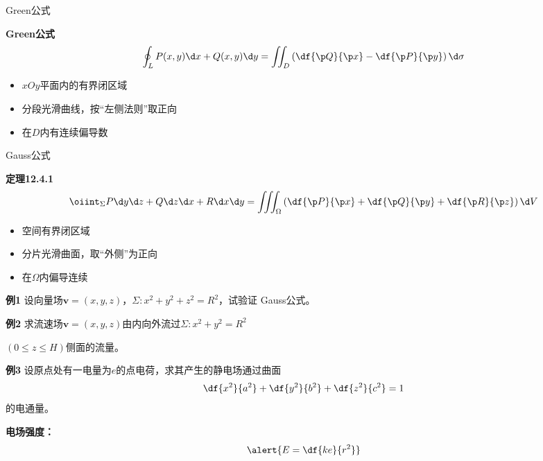 \begin{frame}{Green公式}
	\linespread{1.2}
	\begin{block}{{\bf Green公式}\hfill}
		$$\oint_LP(x,y)\d x+Q(x,y)\d y=\iint_D\left(
		\df{\p Q}{\p x}-\df{\p P}{\p y}\right)\d\sigma$$
	\end{block}
	\begin{itemize}
	  \item {}$xOy$平面内的\alert{有界闭区域}
	  \item {}分段光滑曲线，按\alert{“左侧法则”}取正向
	  \item {}在$D$内有连续偏导数
	\end{itemize}
\end{frame}

\begin{frame}{Gauss公式}
	\linespread{1.2}
	\begin{block}{{\bf 定理12.4.1}\hfill}
	{\small
		$$\oiint_{\Sigma}P\d y\d z+Q\d z\d x+R\d x\d y=\iiint_{\Omega}
		\left(\df{\p P}{\p x}+\df{\p Q}{\p y}+\df{\p R}{\p z}\right)\d V$$
	\vspace{-1em}}\pause
	\end{block}
	\begin{itemize}
	  \item {}空间\alert{有界闭区域}\pause
	  \item {}分片光滑曲面，取\alert{“外侧”}为正向\pause
	  \item {}在$\Omega$内偏导连续
	\end{itemize}
\end{frame}

\begin{frame}
	\linespread{1.2}
	\begin{exampleblock}{{\bf 例1}\hfill}
		设向量场$\bm{v}=(x,y,z)$，$\Sigma:x^2+y^2+z^2=R^2$，试验证
		Gauss公式。
	\end{exampleblock}
	\bigskip\pause
	\begin{exampleblock}{{\bf 例2}\hfill}
		求流速场$\bm{v}=(x,y,z)$由内向外流过$\Sigma:x^2+y^2=R^2$
		
		$(0\leq z\leq H)$侧面的流量。
	\end{exampleblock}
\end{frame}

\begin{frame}
	\linespread{1.2}
	\begin{exampleblock}{{\bf 例3}\hfill}
		设原点处有一电量为$e$的点电荷，求其产生的静电场通过曲面
		$$\df{x^2}{a^2}+\df{y^2}{b^2}+\df{z^2}{c^2}=1$$
		的电通量。
	\end{exampleblock}
	\pause
	{\bf 电场强度：}
	$$\alert{E=\df{ke}{r^2}}$$
\end{frame}

